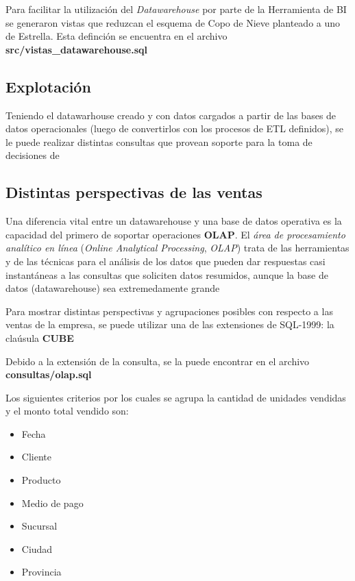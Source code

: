 Para facilitar la utilización del \emph{Datawarehouse} por parte de la Herramienta de BI se generaron vistas que reduzcan el esquema de Copo de Nieve planteado a uno de Estrella. Esta definción se encuentra en el archivo \textbf{src/vistas\_datawarehouse.sql}

\subsection{Explotación}

Teniendo el datawarhouse creado y con datos cargados a partir de las bases de datos operacionales (luego de convertirlos con los procesos de ETL definidos), se le puede realizar distintas consultas que provean soporte para la toma de decisiones de 

\subsection{Distintas perspectivas de las ventas}

Una diferencia vital entre un datawarehouse y una base de datos operativa es la capacidad del primero de soportar operaciones \textbf{OLAP}. El \emph{área de procesamiento analítico en línea} (\emph{Online Analytical Processing}, \emph{OLAP}) trata de las herramientas y de las técnicas para el análisis de los datos que pueden dar respuestas casi instantáneas a las consultas que soliciten datos resumidos, aunque la base de datos (datawarehouse) sea extremedamente grande \autocite{silberschatz-olap}

Para mostrar distintas perspectivas y agrupaciones posibles con respecto a las ventas de la empresa, se puede utilizar una de las extensiones de SQL-1999: la claúsula \textbf{CUBE} 

Debido a la extensión de la consulta, se la puede encontrar en el archivo \textbf{consultas/olap.sql} 

Los siguientes criterios por los cuales se agrupa la cantidad de unidades vendidas y el monto total vendido son:

\begin{itemize}
    \item Fecha
    \item Cliente
    \item Producto
    \item Medio de pago
    \item Sucursal
    \item Ciudad
    \item Provincia
\end{itemize}

